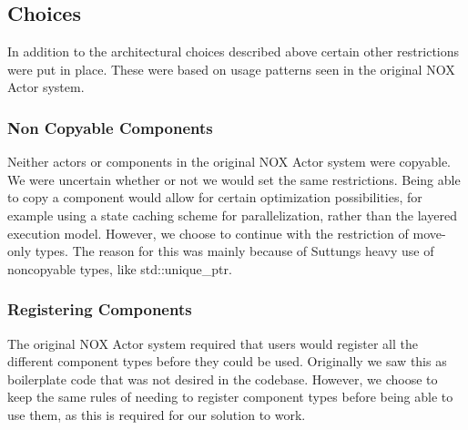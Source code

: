 \subsection{Choices}
In addition to the architectural choices described above certain other restrictions
were put in place.
These were based on usage patterns seen in the original NOX Actor system.

\subsubsection{Non Copyable Components}
Neither actors or components in the original NOX Actor system were copyable.
We were uncertain whether or not we would set the same restrictions.
Being able to copy a component would allow for certain optimization possibilities,
for example using a state caching scheme\cite[p. 930]{game_engine_architecture} for parallelization,
rather than the layered execution model.
However, we choose to continue with the restriction of move-only types.
The reason for this was mainly because of Suttungs heavy use of noncopyable types,
like std::unique\_ptr.

\subsubsection{Registering Components}
The original NOX Actor system required that users would register all the different component types before they could be used.
Originally we saw this as boilerplate code that was not desired in the codebase.
However, we choose to keep the same rules of needing to register component types before being able to use them, as this is required for our solution to work.
